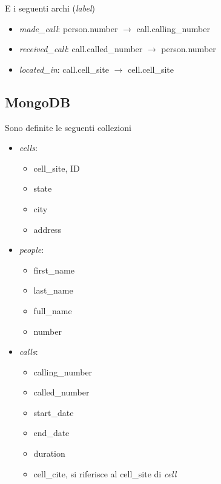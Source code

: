     E i seguenti archi (\textit{label})

    \begin{itemize}
        \item \textit{made\_call}: person.number $\rightarrow$ call.calling\_number
        \item \textit{received\_call}: call.called\_number $\rightarrow$ person.number
        \item \textit{located\_in}: call.cell\_site $\rightarrow$ cell.cell\_site
    \end{itemize}



    \subsection{MongoDB}
    Sono definite le seguenti collezioni
    \begin{itemize}
        \item \textit{cells}:
            \begin{itemize}
                \item cell\_site, ID
                \item state
                \item city
                \item address
            \end{itemize}

        \item \textit{people}:
            \begin{itemize}
                \item first\_name
                \item last\_name
                \item full\_name
                \item number
            \end{itemize}

        \item \textit{calls}:
            \begin{itemize}
                \item calling\_number
                \item called\_number
                \item start\_date
                \item end\_date
                \item duration
                \item cell\_cite, si riferisce al cell\_site di \textit{cell}
            \end{itemize}
    \end{itemize}

